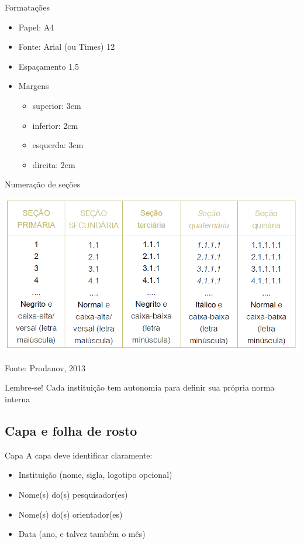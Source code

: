 \documentclass{beamer}
\begin{document}
\begin{frame}{Formatações}
  \begin{itemize}
  \item Papel: A4
  \item Fonte: Arial (ou Times) 12
  \item Espaçamento 1,5
  \item Margens
    \begin{itemize}
    \item superior: 3cm
    \item inferior: 2cm
    \item esquerda: 3cm
    \item direita: 2cm
    \end{itemize}
  \end{itemize}
\end{frame}

\begin{frame}{Numeração de seções}
  \begin{center}
    \includegraphics[width=\textwidth]{EstruturaII/secoes}
  \end{center}

  \vfill
  Fonte: Prodanov, 2013
\end{frame}

\begin{frame}{}
  \begin{block}{Lembre-se!}
    Cada instituição tem autonomia para definir sua própria norma interna
  \end{block}
\end{frame}

\subsection{Capa e folha de rosto}

\begin{frame}{Capa}
A capa deve identificar claramente:
  \begin{itemize}
  \item Instituição (nome, sigla, logotipo opcional)
  \item Nome(s) do(s) pesquisador(es)
  \item Nome(s) do(s) orientador(es)
  \item Data (ano, e talvez também o mês)
  \end{itemize}
\end{frame}
\end{document}
